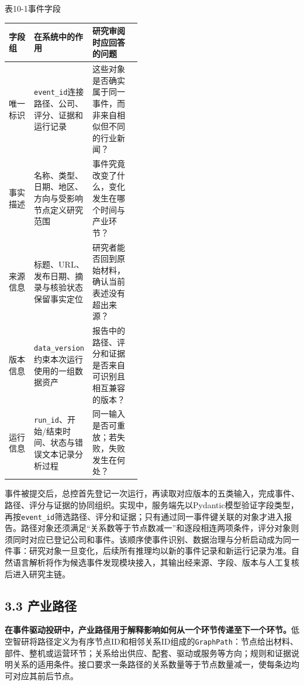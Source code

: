 \begin{center}\small 表10-1\quad 事件字段\par\vspace{1mm}
\begin{tabularx}{\linewidth}{p{0.19\linewidth}p{0.26\linewidth}X}
\toprule
字段组 & 在系统中的作用 & 研究审阅时应回答的问题\\
\midrule
唯一标识 & \texttt{event\_id}连接路径、公司、评分、证据和运行记录 & 这些对象是否确实属于同一事件，而非来自相似但不同的行业新闻？\\
事实描述 & 名称、类型、日期、地区、方向与受影响节点定义研究范围 & 事件究竟改变了什么，变化发生在哪个时间与产业环节？\\
来源信息 & 标题、URL、发布日期、摘录与核验状态保留事实定位 & 研究者能否回到原始材料，确认当前表述没有超出来源？\\
版本信息 & \texttt{data\_version}约束本次运行使用的一组数据资产 & 报告中的路径、评分和证据是否来自可识别且相互兼容的版本？\\
运行信息 & \texttt{run\_id}、开始/结束时间、状态与错误文本记录分析过程 & 同一输入是否可重放；若失败，失败发生在何处？\\
\bottomrule
\end{tabularx}\end{center}

事件被提交后，总控首先登记一次运行，再读取对应版本的五类输入，完成事件、路径、评分与证据的协同组织\cite{lhy-orchestrator}。实现中，服务端先以Pydantic模型验证字段类型，再按\texttt{event\_id}筛选路径、评分和证据；只有通过同一事件键关联的对象才进入报告。路径对象还须满足“关系数等于节点数减一”和逐段相连两项条件，评分对象则须同时对应已登记公司和事件。该顺序使事件识别、数据治理与分析启动成为同一件事：研究对象一旦变化，后续所有推理均以新的事件记录和新运行记录为准。自然语言解析将作为候选事件发现模块接入，其输出经来源、字段、版本与人工复核后进入研究主链。


\subsection*{3.3 产业路径}\label{page:11}
\noindent\textbf{在事件驱动投研中，产业路径用于解释影响如何从一个环节传递至下一个环节。}低空智研将路径定义为有序节点ID和相邻关系ID组成的\texttt{GraphPath}：节点给出材料、部件、整机或运营环节；关系给出供应、配套、驱动或服务等方向；规则和证据说明关系的适用条件。接口要求一条路径的关系数量等于节点数量减一，使每条边均可对应其前后节点\cite{lhy-contracts}。

